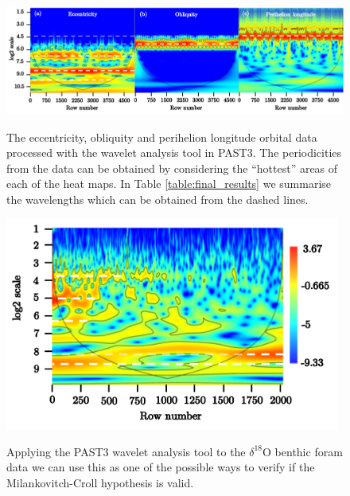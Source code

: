 \documentclass[12pt, onecolumn]{revtex4}    %
\begin{document}
\begin{figure}[!h]
\begin{center}
\includegraphics[width=16cm]{figures/wa_orbital_data}
\caption[]{The eccentricity, obliquity and perihelion longitude orbital data processed with the wavelet analysis tool in PAST3. The periodicities from the data can be obtained by considering the ``hottest'' areas of each of the heat maps. In Table \ref{table:final_results} we summarise the wavelengths which can be obtained from the dashed lines.}
\vspace{-3ex}
\label{fig:wa_orbital_data}
\end{center}
\end{figure}

\begin{figure}[!h]
\begin{center}
\includegraphics[width=11cm]{figures/wa_d18O.pdf}
\caption[]{Applying the PAST3 wavelet analysis tool to the $\delta^{18}$O benthic foram data we can use this as one of the possible ways to verify if the Milankovitch-Croll hypothesis is valid.}
\vspace{-3ex}
\label{fig:wa_d18o}
\end{center}
\end{figure}
\end{document}
